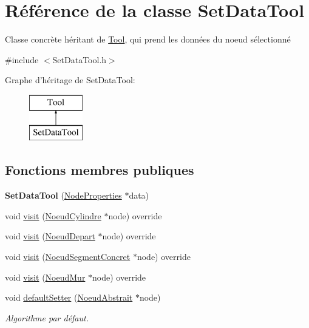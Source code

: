 \hypertarget{class_set_data_tool}{\section{Référence de la classe Set\-Data\-Tool}
\label{class_set_data_tool}
}


Classe concrète héritant de \hyperlink{class_tool}{Tool}, qui prend les données du noeud sélectionné  




{\ttfamily \#include $<$Set\-Data\-Tool.\-h$>$}

Graphe d'héritage de Set\-Data\-Tool\-:\begin{figure}[H]
\begin{center}
\leavevmode
\includegraphics[height=2.000000cm]{class_set_data_tool}
\end{center}
\end{figure}
\subsection*{Fonctions membres publiques}
\begin{DoxyCompactItemize}
\item 
\hypertarget{class_set_data_tool_af24195c8ec7c85e37f59f2bedd4c7431}{{\bfseries Set\-Data\-Tool} (\hyperlink{struct_node_properties}{Node\-Properties} $\ast$data)}\label{class_set_data_tool_af24195c8ec7c85e37f59f2bedd4c7431}

\item 
void \hyperlink{group__inf2990_gaab929a1ed9e3f6a2e80a15aef5de8f71}{visit} (\hyperlink{class_noeud_cylindre}{Noeud\-Cylindre} $\ast$node) override
\item 
void \hyperlink{group__inf2990_gabe996cec1a80bdb4a10383bf4716532d}{visit} (\hyperlink{class_noeud_depart}{Noeud\-Depart} $\ast$node) override
\item 
void \hyperlink{group__inf2990_ga5c1484b543077d2a267347edff94266c}{visit} (\hyperlink{class_noeud_segment_concret}{Noeud\-Segment\-Concret} $\ast$node) override
\item 
void \hyperlink{group__inf2990_ga5833b6797fd9a603bedd502431fc76cc}{visit} (\hyperlink{class_noeud_mur}{Noeud\-Mur} $\ast$node) override
\item 
\hypertarget{group__inf2990_ga410f169c9f53a3a018bce606e0ba9f23}{void \hyperlink{group__inf2990_ga410f169c9f53a3a018bce606e0ba9f23}{default\-Setter} (\hyperlink{class_noeud_abstrait}{Noeud\-Abstrait} $\ast$node)}\label{group__inf2990_ga410f169c9f53a3a018bce606e0ba9f23}

\begin{DoxyCompactList}\small\item\em Algorithme par défaut. \end{DoxyCompactList}\end{DoxyCompactItemize}


